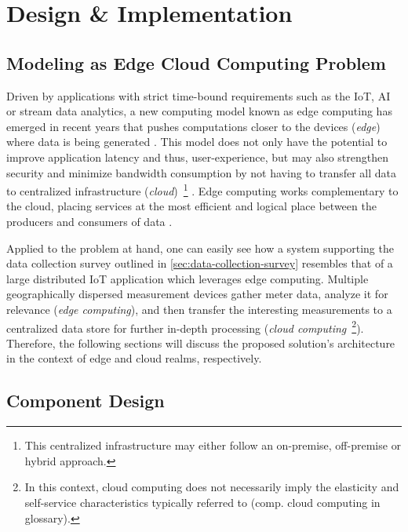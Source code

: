 
\chapter{Design \& Implementation}
\label{chp:architecture}

\section{Modeling as Edge Cloud Computing Problem}
\label{sec:modeling-as-edge-cloud-problem}

Driven by applications with strict time-bound requirements such as the \ac{IoT}, \ac{AI} or stream data analytics, a new computing model known as edge computing has emerged in recent years that pushes computations closer to the devices (\textit{edge}) where data is being generated \cite[p.~373]{xiong2018extend} \cite[p.~118]{alam2018orchestration}. This model does not only have the potential to improve application latency and thus, user-experience, but may also strengthen security and minimize bandwidth consumption by not having to transfer all data to centralized infrastructure (\textit{cloud})~\footnote{This centralized infrastructure may either follow an on-premise, off-premise or hybrid approach.} \cite[p.~295]{hoque2017towards}. Edge computing works complementary to the cloud, placing services at the most efficient and logical place between the producers and consumers of data \cite[p.~122]{alam2018orchestration}.

Applied to the problem at hand, one can easily see how a system supporting the data collection survey outlined in \autoref{sec:data-collection-survey} resembles that of a large distributed \ac{IoT} application which leverages edge computing. Multiple geographically dispersed measurement devices gather meter data, analyze it for relevance (\textit{edge computing}), and then transfer the interesting measurements to a centralized data store for further in-depth processing (\textit{cloud computing}~\footnote{In this context, cloud computing does not necessarily imply the elasticity and self-service characteristics typically referred to (comp. \gls{cloud computing} in glossary).}). Therefore, the following sections will discuss the proposed solution's architecture in the context of edge and cloud realms, respectively.


\section{Component Design}
\label{sec:component-design}

